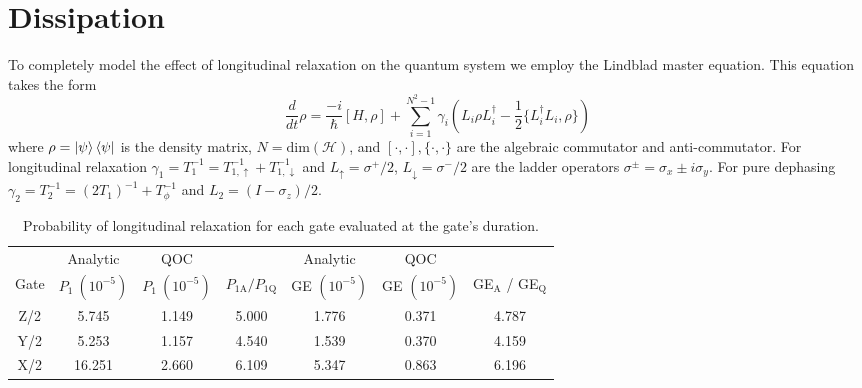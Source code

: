 \section{Dissipation}
To completely model the effect of longitudinal
relaxation on the quantum system we employ
the Lindblad master equation. This equation takes the form
\begin{equation}
  \frac{d}{dt} \rho = \frac{-i}{\hbar} [H, \rho] + \sum_{i = 1}^{N^{2} - 1} \gamma_{i} (L_{i} \rho L_{i}^{\dagger} - \frac{1}{2} \{L_{i}^{\dagger} L_{i}, \rho\})
\end{equation}
where $\rho = \ket{\psi}\bra{\psi}$ is the density matrix, $N = \textrm{dim}(\mathcal{H})$,
and $[\cdot, \cdot], \{\cdot, \cdot \}$ are the algebraic commutator and anti-commutator.
For longitudinal relaxation $\gamma_{1} = T_{1}^{-1} = T_{1, \uparrow}^{-1} + T_{1, \downarrow}^{-1}$
and $L_{\uparrow} = \sigma^{+}/2$,
$L_{\downarrow} = \sigma^{-}/2$
are the ladder operators $\sigma^{\pm} = \sigma_{x} \pm i \sigma_{y}$. For pure dephasing
$\gamma_{2} = T_{2}^{-1} = (2 T_{1})^{-1} + T_{\phi}^{-1}$ and
$L_{2} = (I - \sigma_{z})/2$.

\begin{table}[ht]
  \begin{tabular}{c | c | c | c | c | c | c}
         & Analytic & QOC & & Analytic & QOC & \\
    Gate & $P_{1}\ (10^{-5})$ & $P_{1}\ (10^{-5})$ & $P_{1\textrm{A}} / P_{1\textrm{Q}}$
    & GE $(10^{-5})$ & GE $(10^{-5})$ & GE$_{\textrm{A}}$ / GE$_{\textrm{Q}}$\\
    \hline
    Z/2 & 5.745  & 1.149 & 5.000 & 1.776 & 0.371 & 4.787\\
    Y/2 & 5.253  & 1.157 & 4.540 & 1.539 & 0.370 & 4.159\\
    X/2 & 16.251 & 2.660 & 6.109 & 5.347 & 0.863 & 6.196\\
  \end{tabular}
  \caption{Probability of longitudinal relaxation for each gate
    evaluated at the gate's duration.}
\end{table}
